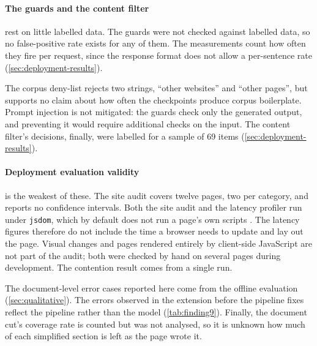 \paragraph{The guards and the content filter} rest on little labelled data.
The guards were not checked against labelled data, so no false-positive rate exists for any of them.
The measurements count how often they fire per request, since the response format does not allow a per-sentence rate (\cref{sec:deployment-results}).

The corpus deny-list rejects two strings, ``other websites'' and ``other pages'', but supports no claim about how often the checkpoints produce corpus boilerplate.
Prompt injection is not mitigated: the guards check only the generated output, and preventing it would require additional checks on the input.
The content filter's decisions, finally, were labelled for a sample of 69 items (\cref{sec:deployment-results}).

\paragraph{Deployment evaluation validity} is the weakest of these.
The site audit covers twelve pages, two per category, and reports no confidence intervals.
Both the site audit and the latency profiler run under \texttt{jsdom}, which by default does not run a page's own scripts \parencite{jsdom2026}.
The latency figures therefore do not include the time a browser needs to update and lay out the page.
Visual changes and pages rendered entirely by client-side JavaScript are not part of the audit; both were checked by hand on several pages during development.
The contention result comes from a single run.

The document-level error cases reported here come from the offline evaluation (\cref{sec:qualitative}).
The errors observed in the extension before the pipeline fixes reflect the pipeline rather than the model (\cref{tab:finding9}).
Finally, the document cut's coverage rate is counted but was not analysed, so it is unknown how much of each simplified section is left as the page wrote it.
